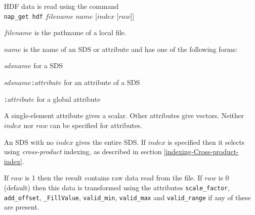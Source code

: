 HDF data is read using the command
\\
\texttt{nap\_get hdf} $\mathit{filename}$ $\mathit{name}$ [$\mathit{index}$ [$\mathit{raw}$]]

\noindent
  $\mathit{filename}$ is the pathname of a local file.

\noindent
  $\mathit{name}$ is the name of an SDS or attribute and has 
one of the following forms:
\begin{bullets}
    \item $\mathit{sdsname}$ for a SDS
    \item $\mathit{sdsname}$\texttt{:}$\mathit{attribute}$ for an attribute of a SDS
    \item \texttt{:}$\mathit{attribute}$ for a global attribute
\end{bullets}
  
A single-element attribute gives a scalar. Other attributes give
  vectors. Neither 
  $\mathit{index}$ nor 
  $\mathit{raw}$ can be specified for attributes.

An SDS with no $\mathit{index}$ gives the entire SDS.
If $\mathit{index}$ is specified then it selects using 
{\em cross-product} indexing, as described in section
  \ref{indexing-Cross-product-index}.

If 
  $\mathit{raw}$ is 1 then the result contains raw data read from the
  file. If 
  $\mathit{raw}$ is 0 (default) then this data is transformed using the
  attributes 
  \texttt{scale\_factor}, 
  \texttt{add\_offset}, 
  \texttt{\_FillValue}, 
  \texttt{valid\_min}, 
  \texttt{valid\_max} and 
  \texttt{valid\_range} if any of these are present.
  

